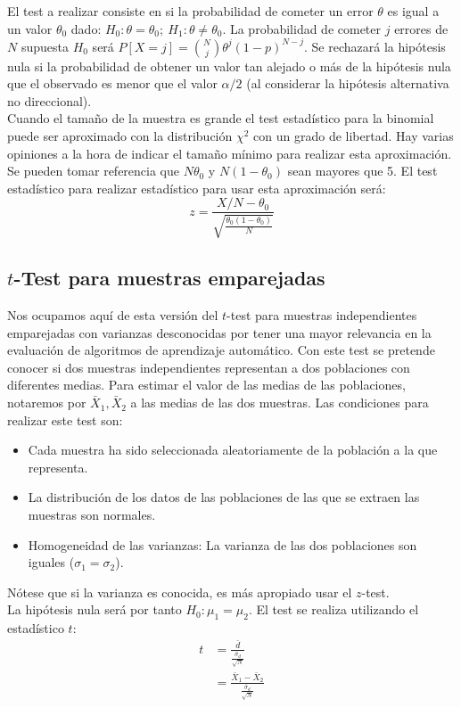 	El test a realizar consiste en si la probabilidad de 
cometer un error $\theta$ es igual a un valor $\theta_0$
dado: $H_0: \theta = \theta_0;\ H_1: \theta \neq \theta_0$.
La probabilidad de cometer $j$ errores de $N$ supuesta $H_0$
será $P[X = j] = {N \choose j} \theta^j (1-p)^{N-j}$. Se 
rechazará la hipótesis nula si la probabilidad de obtener un 
valor tan alejado o más de la hipótesis nula que el observado 
es menor que el valor $\alpha/2$ (al considerar la hipótesis 
alternativa no direccional).\\
	Cuando el tamaño de la muestra es grande el test 
estadístico para la binomial puede ser aproximado con la 
distribución $\chi^2$ con un grado de libertad. Hay varias 
opiniones a la hora de indicar el tamaño mínimo para realizar
esta aproximación. Se pueden tomar referencia que 
$N \theta_0$ y $N (1 - \theta_0)$ sean mayores que 5. El test 
estadístico para realizar estadístico para usar esta 
aproximación será:
	\[
		z = \frac{X/N - \theta_0}
				{\sqrt{\frac{\theta_0(1 - \theta_0)}
							{N}}}
	\]
	
\subsection{$t$-Test para muestras emparejadas}

	Nos ocupamos aquí de esta versión del $t$-test para 
muestras independientes emparejadas con varianzas 
desconocidas por tener una mayor relevancia en la evaluación 
de algoritmos de aprendizaje automático. Con este test se 
pretende conocer si dos muestras independientes representan
a dos poblaciones con diferentes medias. Para estimar el
valor de las medias de las poblaciones, notaremos por 
$\bar{X}_1, \bar{X}_2$ a las medias de las dos muestras. Las 
condiciones para realizar este test son:
	
	\begin{itemize}
	\item Cada muestra ha sido seleccionada aleatoriamente 
		de la población a la que representa.
	\item La distribución de los datos de las poblaciones de 
		las que se extraen las muestras son normales.
	\item Homogeneidad de las varianzas: La varianza de las 
		dos poblaciones son iguales ($\sigma_1 = \sigma_2$).
	\end{itemize}
	
	Nótese que si la varianza es conocida, es más apropiado 
usar el $z$-test.\\
	La hipótesis nula será por tanto $H_0: \mu_1 = \mu_2$.
El test se realiza utilizando el estadístico $t$:
\begin{align*}
	t 	&= \frac{\bar{d}}
			{\frac{\bar{\sigma}_d}{\sqrt{N}}} \\
		&= \frac{\bar{X}_1 - \bar{X}_2}
			{\frac{\bar{\sigma}_d}{\sqrt{N}}} 
\end{align*}
	
